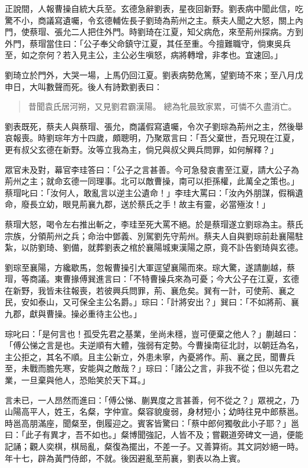 正說間，人報曹操自統大兵至。玄德急辭劉表，星夜回新野。劉表病中聞此信，吃驚不小，商議寫遺囑，令玄德輔佐長子劉琦為荊州之主。蔡夫人聞之大怒，關上內門，使蔡瑁、張允二人把住外門。時劉琦在江夏，知父病危，來至荊州探病。方到外門，蔡瑁當住曰：「公子奉父命鎮守江夏，其任至重。今擅難職守，倘東吳兵至，如之奈何？若入見主公，主公必生嗔怒，病將轉增，非孝也。宜速回。」

劉琦立於門外，大哭一場，上馬仍回江夏。劉表病勢危篤，望劉琦不來；至八月戊申日，大叫數聲而死。後人有詩歎劉表曰：

\begin{quote}
昔聞袁氏居河朔，又見劉君霸漢陽。
總為牝晨致家累，可憐不久盡消亡。
\end{quote}

劉表既死，蔡夫人與蔡瑁、張允，商議假寫遺囑，令次子劉琮為荊州之主，然後舉哀報喪。時劉琮年方十四歲，頗聰明，乃聚眾言曰：「吾父棄世，吾兄現在江夏，更有叔父玄德在新野。汝等立我為主，倘兄與叔父興兵問罪，如何解釋？」

眾官未及對，幕官李珪答曰：「公子之言甚善。今可急發哀書至江夏，請大公子為荊州之主；就命玄德一同理事。北可以敵曹操，南可以拒孫權，此萬全之策也。」蔡瑁叱曰：「汝何人，敢亂言以逆主公遺命！」李珪大罵曰：「汝內外朋謀，假稱遺命，廢長立幼，眼見荊襄九郡，送於蔡氏之手！故主有靈，必當殛汝！」

蔡瑁大怒，喝令左右推出斬之，李珪至死大罵不絕。於是蔡瑁遂立劉琮為主。蔡氏宗族，分領荊州之兵；命治中鄧義、別駕劉先守荊州。蔡夫人自與劉琮前赴襄陽駐紮，以防劉琦、劉備，就葬劉表之棺於襄陽城東漢陽之原，竟不訃告劉琦與玄德。

劉琮至襄陽，方纔歇馬，忽報曹操引大軍逕望襄陽而來。琮大驚，遂請蒯越，蔡瑁，等商議。東曹掾傅巽進言曰：「不特曹操兵來為可憂；今大公子在江夏，玄德在新野，我皆未往報喪，若彼興兵問罪，荊、襄危矣。巽有一計，可使荊、襄之民，安如泰山，又可保全主公名爵。」琮曰：「計將安出？」巽曰：「不如將荊、襄九郡，獻與曹操。操必重待主公也。」

琮叱曰：「是何言也！孤受先君之基業，坐尚未穩，豈可便棄之他人？」蒯越曰：「傅公悌之言是也。夫逆順有大體，強弱有定勢。今曹操南征北討，以朝廷為名，主公拒之，其名不順。且主公新立，外患未寧，內憂將作。荊、襄之民，聞曹兵至，未戰而膽先寒，安能與之敵哉？」琮曰：「諸公之言，非我不從；但以先君之業，一旦棄與他人，恐貽笑於天下耳。」

言未已，一人昂然而進曰：「傅公悌、蒯異度之言甚善，何不從之？」眾視之，乃山陽高平人，姓王，名粲，字仲宣。粲容貌廋弱，身材短小；幼時往見中郎蔡邕。時邕高朋滿座，聞粲至，倒履迎之。賓客皆驚曰：「蔡中郎何獨敬此小子耶？」邕曰：「此子有異才，吾不如也。」粲博聞強記，人皆不及；嘗觀道旁碑文一過，便能記誦；觀人奕棋，棋局亂，粲復為擺出，不差一子。又善算術。其文詞妙絕一時。年十七，辟為黃門侍郎，不就。後因避亂至荊襄，劉表以為上賓。


